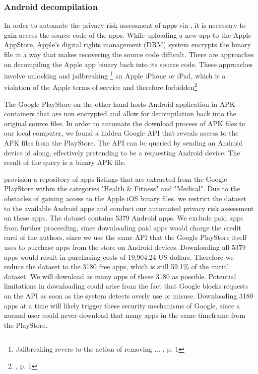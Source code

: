 \documentclass[
	a4paper,
	oneside,
	12pt,
	liststotocnumbered
]{article}
\let\cite\textcite
\begin{document}
\subsubsection{Android decompilation}

In order to automate the privacy risk assessment of \mH apps via \sca, it is necessary to gain access the source code of the apps. 
While uploading a new app to the Apple AppStore, Apple's digital rights management (\acs{DRM}) system encrypts the binary file in a way that makes recovering the source code difficult. 
There are approaches on decompiling the Apple app binary back into its source code.
These approaches involve unlocking and jailbreaking
\footnote{Jailbreaking revers to the action of removing ... \cite{Kweller2010}, p. 1}
an Apple iPhone or iPad, which is a violation of the Apple terms of service and therefore forbidden\footnote{\cite{Kweller2010}, p. 1}

The Google PlayStore on the other hand hosts Android application in \acs{APK} containers that are non encrypted and allow for decompilation back into the original source files. 
In order to automate the download process of \acs{APK} files to our local computer, we found a hidden Google \acs{API} that reveals access to the \acs{APK} files from the PlayStore. 
The \acs{API} can be queried by sending an Android device id along, effectively pretending to be a requesting Android device.
The result of the query is a binary \acs{APK} file.

\cite{Xu2015} provision a repository of apps listings that are extracted from the Google PlayStore within the categories "Health \& Fitness" and "Medical".
Due to the obstacles of gaining access to the Apple iOS binary files, we restrict the dataset to the available Android apps and conduct our automated privacy risk assessment on these apps.
The \cite{Xu2015} dataset contains 5379 Android apps. 
We exclude paid apps from further proceeding, since downloading paid apps would charge the credit card of the authors, since we use the same \acs{API} that the Google PlayStore itself uses to purchase apps from the store on Android devices. 
Downloading all 5379 apps would result in purchasing costs of 19,904.24 US-dollars. 
Therefore we reduce the dataset to the 3180 free apps, which is still 59.1\% of the  initial dataset. 
We will download as many apps of these 3180 as possible.
Potential limitations in downloading could arise from the fact that Google blocks requests on the API as soon as the system detects overly use or misuse. Downloading 3180 apps at a time will likely trigger these security mechanisms of Google, since a normal user could never download that many apps in the same timeframe from the PlayStore.
\end{document}
